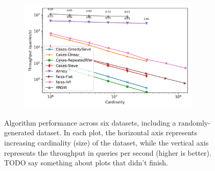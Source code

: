 \begin{figure}
\begin{subfigure}[b]{0.47\textwidth}
\label{fig:results:silva-scaling}
\end{subfigure}%
\begin{subfigure}[b]{0.47\textwidth}
\includegraphics[width=0.95\textwidth]{plots/random-knn-10.png}
\label{fig:results:random-scaling}
\end{subfigure}%




\caption{Algorithm performance across six datasets, including a randomly-generated dataset. In each plot, the horizontal axis represents increasing cardinality (size) of the dataset, while the vertical axis represents the throughput in queries per second (higher is better). TODO say something about plots that didn't finish.}
\end{figure}


